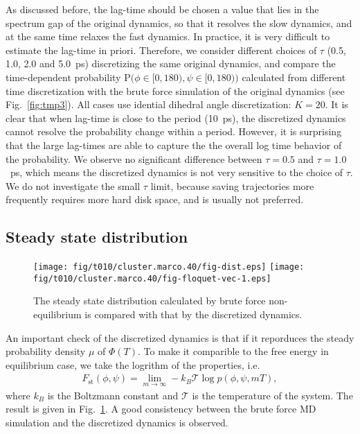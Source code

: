 \documentclass[aps, pre, preprint,unsortedaddress,a4paper,onecolumn]{revtex4}
\newcommand{\myphi}{\Phi}
\newcommand{\mymu}{\mu}
\newcommand{\prob}{\textrm{P}}
\begin{document}
As discussed before, the lag-time should be chosen a value that lies
in the spectrum gap of the original dynamics, so that it resolves the
slow dynamics, and at the same time relaxes the fast dynamics. In
practice, it is very difficult to estimate the lag-time in
priori. Therefore, we consider 
different choices of $\tau$ (0.5, 1.0, 2.0 and 5.0~ps)
discretizing the same original dynamics, and compare the
time-dependent probability $\prob\big(\phi\in[0,180), \psi\in
[0,180)\big)$ calculated from different time discretization with the brute force simulation
of the original dynamics
(see Fig.~\ref{fig:tmp3}).  All cases use idential dihedral angle discretization: $K=20$.
It is clear that when lag-time is close to the period (10~ps), the
discretized dynamics cannot resolve the probability change within a
period. However, it is surprising  that the large lag-times are able to capture the
the overall log time behavior of the probability.
We observe no significant difference between $\tau=0.5$ and
$\tau=1.0$~ps, which means the discretized dynamics is not very sensitive
to the choice of $\tau$. 
We do not investigate the small $\tau$ limit, because saving trajectories
more frequently requires more hard disk space, and is usually not preferred.

\subsection{Steady state distribution}

\begin{figure}
  \centering  
  \texttt{[image: fig/t010/cluster.marco.40/fig-dist.eps]}
  \texttt{[image: fig/t010/cluster.marco.40/fig-floquet-vec-1.eps]}
  \caption{The steady state distribution calculated by brute force non-equilibrium is compared with that by the discretized dynamics.}
  \label{fig:num-1}
\end{figure}

An important check of the discretized dynamics is that if it reporduces the steady probability
density $\mymu$ of $\myphi(T)$.
To make it comparible to
the free energy in equilibrium case, we take the logrithm of the properties, i.e.
\begin{align}
  \label{eq:num-tmp1}
  F_{\textrm{st}}(\phi,\psi) = \lim_{m\rightarrow\infty} -k_B\mathcal T \log p(\phi,\psi,mT),
\end{align}
where $k_B$ is the Boltzmann constant and $\mathcal T$ is the temperature of the system.
The result is given in Fig.~\ref{fig:num-1}. A good consistency between the brute force
MD simulation and the discretized dynamics is observed.
\end{document}
